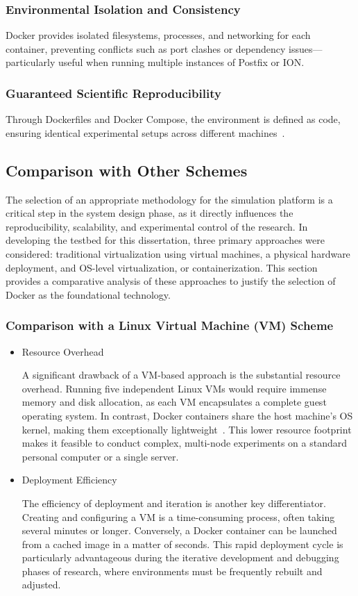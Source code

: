 \subsubsection*{Environmental Isolation and Consistency}
Docker provides isolated filesystems, processes, and networking for each container, preventing conflicts such as port clashes or dependency issues—particularly useful when running multiple instances of Postfix or ION.

\subsubsection*{Guaranteed Scientific Reproducibility}
Through Dockerfiles and Docker Compose, the environment is defined as code, ensuring identical experimental setups across different machines~\cite{DockerRepo}.

\subsection{Comparison with Other Schemes} \label{sec:comparison}
The selection of an appropriate methodology for the simulation platform is a critical step in the system design phase, as it directly influences the reproducibility, scalability, and experimental control of the research. In developing the testbed for this dissertation, three primary approaches were considered: traditional virtualization using virtual machines, a physical hardware deployment, and OS-level virtualization, or containerization. This section provides a comparative analysis of these approaches to justify the selection of Docker as the foundational technology.

\subsubsection*{Comparison with a Linux Virtual Machine (VM) Scheme}
\begin{itemize}
    \item Resource Overhead
    
    A significant drawback of a VM-based approach is the substantial resource overhead. Running five independent Linux VMs would require immense memory and disk allocation, as each VM encapsulates a complete guest operating system. In contrast, Docker containers share the host machine's OS kernel, making them exceptionally lightweight~\cite{DockerPerfComp}. This lower resource footprint makes it feasible to conduct complex, multi-node experiments on a standard personal computer or a single server.
    \item Deployment Efficiency
    
    The efficiency of deployment and iteration is another key differentiator. Creating and configuring a VM is a time-consuming process, often taking several minutes or longer. Conversely, a Docker container can be launched from a cached image in a matter of seconds. This rapid deployment cycle is particularly advantageous during the iterative development and debugging phases of research, where environments must be frequently rebuilt and adjusted.
\end{itemize}

